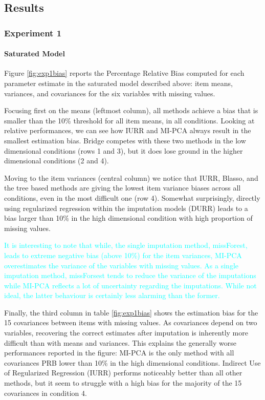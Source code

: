 \FloatBarrier %

\subsection{Results}

\subsubsection{Experiment 1}

	\paragraph{Saturated Model} Figure \ref{fig:exp1bias} reports the Percentage Relative Bias computed 
	for each parameter estimate in the saturated model described above: item means, variances, and covariances for
	the six variables with missing values.

	Focusing first on the means (leftmost column), all methods achieve a bias that is smaller than the 10\% threshold 
	for all item means, in all conditions.
	Looking at relative performances, we can see how IURR and MI-PCA always result in the smallest
	estimation bias. 
	Bridge competes with these two methods in the low dimensional conditions (rows 1 and 3), but it 
	does lose ground in the higher dimensional conditions (2 and 4).

	Moving to the item variances (central column) we notice that IURR, Blasso, and the tree based methods are 
	giving the lowest item variance biases across all conditions, even in the most difficult one (row 4).
	Somewhat surprisingly, directly using regularized regression within the imputation models (DURR) leads
	to a bias larger than 10\% in the high dimensional condition with high proportion of missing values.
	
\textcolor{cyan}{
	It is interesting to note that while, the single imputation method, missForest, leads to extreme negative bias 
	(above 10\%) for the item variances, MI-PCA overestimates the variance of the variables with missing values.
	As a single imputation method, missForsest tends to reduce the variance of the imputations while MI-PCA reflects
	a lot of uncertainty regarding the imputations.
	While not ideal, the latter behaviour is certainly less alarming than the former.
}
	
	Finally, the third column in table \ref{fig:exp1bias} shows the estimation bias for the 15
	covariances between items with missing values.
	As covariances depend on two variables, recovering the correct estimates after imputation is inherently 
	more difficult than with means and variances.
	This explains the generally worse performances reported in the figure: MI-PCA is the only method with
	all covariances PRB lower than 10\% in the high dimensional conditions.
	Indirect Use of Regularized Regression (IURR) performs noticeably better than all other methods, but it 
	seem to struggle with a high bias for the majority of the 15 covariances in condition 4.

